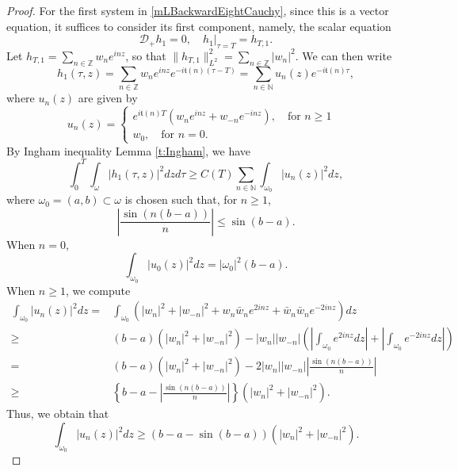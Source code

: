 \documentclass[12pt]{amsart}
\theoremstyle{remark}
\theoremstyle{definition}
\numberwithin{equation}{section}
\newcommand{\N}{\mathbb{N}}
\newcommand{\Z}{\mathbb{Z}}
\newcommand{\f}{\frac}
\newcommand{\mD}{\mathcal{D}}
\begin{document}
\begin{proof}
For the first system in \eqref{mLBackwardEightCauchy}, since this is a vector equation, it suffices to consider its first component, namely, the scalar equation
\begin{equation} \label{mD+ScalarEqn}
\mD_+ h_1 = 0, \quad 
h_1|_{\tau=T} = h_{T,1}.
\end{equation}
Let $h_{T,1} = \sum_{n\in \Z} w_n e^{inz}$, so that $\| h_{T,1}\|_{L^2}^2 = \sum_{n\in \Z} |w_n|^2$.
We can then write
\begin{equation*}
    h_1(\tau,z) =  \sum_{n\in \Z} w_n e^{inz}e^{-i\mathfrak{t}(n)(\tau-T)} = \sum_{n\in \N} u_n(z) e^{-i\mathfrak{t}(n)\tau},
\end{equation*}
where $u_n(z)$ are given by
\begin{equation*}
 u_n(z) = \left\{
\begin{array}{lr}
e^{i\mathfrak{t}(n)T}(w_n e^{inz}+ w_{-n}e^{-inz}), \quad \text{for } n\geq1 &  \\
w_0, \quad \text{for } n = 0.&
\end{array}
\right. 
\end{equation*}
By Ingham inequality Lemma \ref{t:Ingham}, we have 
\begin{equation}\label{h1geqzn}
\int_0^T \int_\omega |h_1(\tau,z)|^2 dzd\tau \geq C(T) \sum_{n\in\mathbb{N}}\int_{\omega_0}|u_n(z)|^2dz,
\end{equation}
where $\omega_0=(a, b)\subset\omega$ is chosen such that, for $n\geq1$,
\begin{equation*}
\left|\f{\sin(n(b-a))}{n}\right|\leq \sin(b-a). 
\end{equation*}
When $n=0$, 
\begin{equation*}
\int_{\omega_0}|u_0(z)|^2dz=|\omega_0|^2(b-a).
\end{equation*}
When $n\geq1$, we compute
\begin{align*}
\int_{\omega_0}|u_n(z)|^2dz=&\int_{\omega_0}\left(|w_n|^2+|w_{-n}|^2+w_n\bar{w}_ne^{2inz}+\bar{w}_n\bar{w}_ne^{-2inz}\right)dz\\
\geq&(b-a)(|w_n|^2+|w_{-n}|^2)-|w_n||w_{-n}|\left(\left|\int_{\omega_0}e^{2inz}dz\right|+\left|\int_{\omega_0}e^{-2inz}dz\right|\right)\\
=&(b-a)(|w_n|^2+|w_{-n}|^2)-2|w_n||w_{-n}|\left|\f{\sin(n(b-a))}{n}\right|\\
\geq&\left\{b-a-\left|\f{\sin(n(b-a))}{n}\right|\right\}(|w_n|^2+|w_{-n}|^2).
\end{align*}
Thus, we obtain that
\begin{equation*}
\int_{\omega_0}|u_n(z)|^2dz\geq \left(b-a-\sin(b-a)\right)(|w_n|^2+|w_{-n}|^2).

\end{equation*}
\end{proof}
\end{document}

